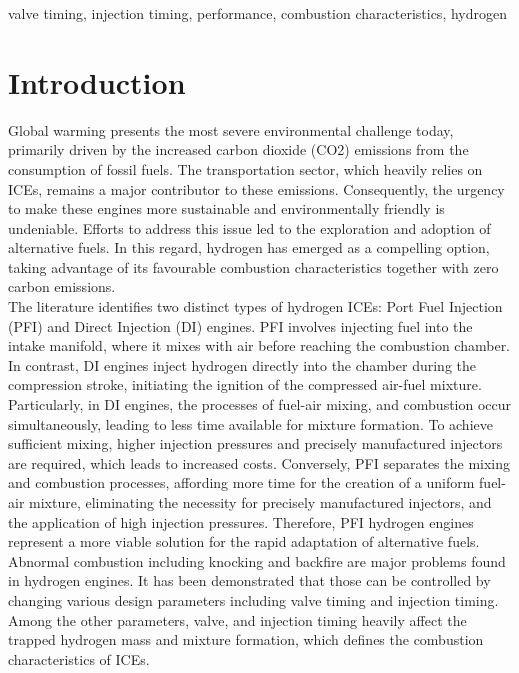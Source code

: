 \documentclass[conference]{IEEEtran}
\begin{document}
\begin{IEEEkeywords}
valve timing, injection timing, performance, combustion characteristics, hydrogen
\end{IEEEkeywords}

\section{Introduction}

Global warming presents the most severe environmental challenge today, primarily driven by the increased carbon dioxide (CO2) emissions from the consumption of fossil fuels. The transportation sector, which heavily relies on ICEs, remains a major contributor to these emissions. Consequently, the urgency to make these engines more sustainable and environmentally friendly is undeniable. Efforts to address this issue led to the exploration and adoption of alternative fuels. In this regard, hydrogen has emerged as a compelling option, taking advantage of its favourable combustion characteristics together with zero carbon emissions.\\

The literature identifies two distinct types of hydrogen ICEs: Port Fuel Injection (PFI) and Direct Injection (DI) engines. PFI involves injecting fuel into the intake manifold, where it mixes with air before reaching the combustion chamber. In contrast, DI engines inject hydrogen directly into the chamber during the compression stroke, initiating the ignition of the compressed air-fuel mixture. Particularly, in DI engines, the processes of fuel-air mixing, and combustion occur simultaneously, leading to less time available for mixture formation. To achieve sufficient mixing, higher injection pressures and precisely manufactured injectors are required, which leads to increased costs. Conversely, PFI separates the mixing and combustion processes, affording more time for the creation of a uniform fuel-air mixture, eliminating the necessity for precisely manufactured injectors, and the application of high injection pressures. Therefore, PFI hydrogen engines represent a more viable solution for the rapid adaptation of alternative fuels.\\

Abnormal combustion including knocking and backfire are major problems found in hydrogen engines. It has been demonstrated that those can be controlled by changing various design parameters including valve timing and injection timing. Among the other parameters, valve, and injection timing heavily affect the trapped hydrogen mass and mixture formation, which defines the combustion characteristics of ICEs.\\
\end{document}
